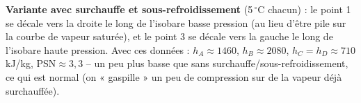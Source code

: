 \documentclass[11pt,a4paper]{article}
\begin{document}
\begin{info}
\textbf{Variante avec surchauffe et sous-refroidissement} (5$\,^\circ$C chacun) : le point 1 se
décale vers la droite le long de l'isobare basse pression (au lieu d'être pile sur la courbe de
vapeur saturée), et le point 3 se décale vers la gauche le long de l'isobare haute pression. Avec ces
données : $h_A\approx1460$, $h_B\approx2080$, $h_C=h_D\approx710$ kJ/kg, PSN$\approx3{,}3$ -- un peu
plus basse que sans surchauffe/sous-refroidissement, ce qui est normal (on « gaspille » un peu de
compression sur de la vapeur déjà surchauffée).
\end{info}
\end{document}
